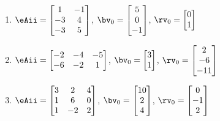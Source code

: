 \begin{exercise}
\begin{enumerate}
\item \(\eAii=\begin{bmatrix} 1&-1
\\-3&4
\\-3&5 \end{bmatrix}\),
\(\bv_{\arabic{enumii}}=\begin{bmatrix} 5
\\0
\\-1 \end{bmatrix}\),
\(\rv_{\arabic{enumii}}=\begin{bmatrix} 0
\\1 \end{bmatrix}\)

\item \(\eAii=\begin{bmatrix} -2&-4&-5
\\-6&-2&1 \end{bmatrix}\),
\(\bv_{\arabic{enumii}}=\begin{bmatrix} 3
\\1 \end{bmatrix}\),
\(\rv_{\arabic{enumii}}=\begin{bmatrix} 2
\\-6
\\-11 \end{bmatrix}\)

\item \(\eAii=\begin{bmatrix} 3&2&4
\\1&6&0
\\1&-2&2 \end{bmatrix}\),
\(\bv_{\arabic{enumii}}=\begin{bmatrix} 10
\\2
\\4 \end{bmatrix}\),
\(\rv_{\arabic{enumii}}=\begin{bmatrix} 0
\\-1
\\2 \end{bmatrix}\)


\end{enumerate}
\end{exercise}
